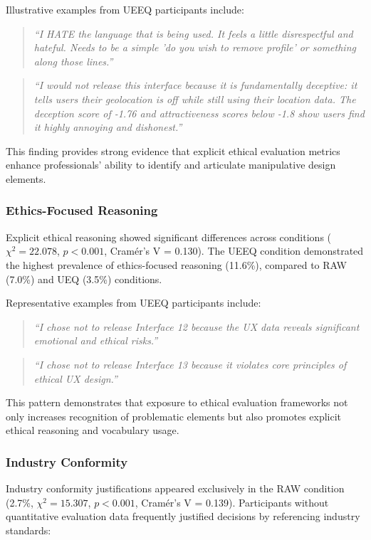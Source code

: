 Illustrative examples from UEEQ participants include:
\begin{quote}
\textit{``I HATE the language that is being used. It feels a little disrespectful and hateful. Needs to be a simple 'do you wish to remove profile' or something along those lines.''}
\end{quote}

\begin{quote}
\textit{``I would not release this interface because it is fundamentally deceptive: it tells users their geolocation is off while still using their location data. The deception score of -1.76 and attractiveness scores below -1.8 show users find it highly annoying and dishonest.''}
\end{quote}

This finding provides strong evidence that explicit ethical evaluation metrics enhance professionals' ability to identify and articulate manipulative design elements.

\subsubsection{Ethics-Focused Reasoning}
Explicit ethical reasoning showed significant differences across conditions ($\chi^2 = 22.078$, $p < 0.001$, Cramér's V = 0.130). The UEEQ condition demonstrated the highest prevalence of ethics-focused reasoning (11.6\%), compared to RAW (7.0\%) and UEQ (3.5\%) conditions.

Representative examples from UEEQ participants include:
\begin{quote}
\textit{``I chose not to release Interface 12 because the UX data reveals significant emotional and ethical risks.''}
\end{quote}

\begin{quote}
\textit{``I chose not to release Interface 13 because it violates core principles of ethical UX design.''}
\end{quote}

This pattern demonstrates that exposure to ethical evaluation frameworks not only increases recognition of problematic elements but also promotes explicit ethical reasoning and vocabulary usage.

\subsubsection{Industry Conformity}
Industry conformity justifications appeared exclusively in the RAW condition (2.7\%, $\chi^2 = 15.307$, $p < 0.001$, Cramér's V = 0.139). Participants without quantitative evaluation data frequently justified decisions by referencing industry standards:

